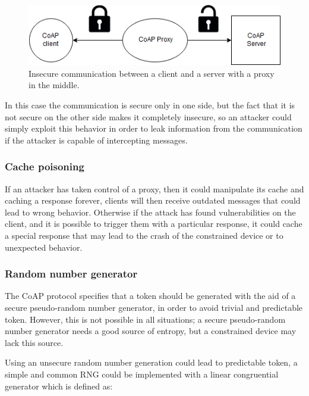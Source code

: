 	\begin{figure}
		\includegraphics[width=\linewidth]{coap-vuln-img4.png}
		\caption{Insecure communication between a client and a server with a proxy in the middle.}
		\label{fig:coap-vuln4}
	\end{figure}
	
	In this case the communication is secure only in one side, but the fact that it is not secure on the other side makes it completely insecure, so an attacker could simply exploit this behavior in order to leak information from the communication if the attacker is capable of intercepting messages.\newline
	
	\subsubsection{Cache poisoning}
	If an attacker has taken control of a proxy, then it could manipulate its cache and caching a response forever, clients will then receive outdated messages that could lead to wrong behavior.\newline
	Otherwise if the attack has found vulnerabilities on the client, and it is possible to trigger them with a particular response, it could cache a special response that may lead to the crash of the constrained device or to unexpected behavior.
	
	\subsubsection{Random number generator}
	The CoAP protocol specifies that a token should be generated with the aid of a secure pseudo-random number generator, in order to avoid trivial and predictable token.\newline
	However, this is not possible in all situations; a secure pseudo-random number generator needs a good source of entropy, but a constrained device may lack this source.\newline
	
	Using an unsecure random number generation could lead to predictable token, a simple and common RNG could be implemented with a linear congruential generator which is defined as:
	
